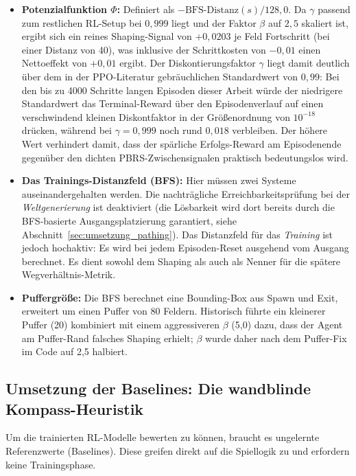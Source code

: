 \documentclass[
  a4paper,
  11pt,
  twoside,
  BCOR=8mm,           %
  headings=big,
  numbers=noenddot,
  listof=totoc,       %
  captions=tableheading,
]{scrreprt}
\begin{document}
\begin{itemize}
    \item \textbf{Potenzialfunktion $\Phi$:} Definiert als $-\text{BFS-Distanz}(s) / 128{,}0$. Da $\gamma$ passend zum restlichen RL-Setup bei $0{,}999$ liegt und der Faktor $\beta$ auf $2{,}5$ skaliert ist, ergibt sich ein reines Shaping-Signal von $+0{,}0203$ je Feld Fortschritt (bei einer Distanz von 40), was inklusive der Schrittkosten von $-0{,}01$ einen Nettoeffekt von $+0{,}01$ ergibt. Der Diskontierungsfaktor $\gamma$ liegt damit deutlich über dem in der PPO-Literatur gebräuchlichen Standardwert von $0{,}99$: Bei den bis zu 4000 Schritte langen Episoden dieser Arbeit würde der niedrigere Standardwert das Terminal-Reward über den Episodenverlauf auf einen verschwindend kleinen Diskontfaktor in der Größenordnung von $10^{-18}$ drücken, während bei $\gamma = 0{,}999$ noch rund $0{,}018$ verbleiben. Der höhere Wert verhindert damit, dass der spärliche Erfolgs-Reward am Episodenende gegenüber den dichten PBRS-Zwischensignalen praktisch bedeutungslos wird.
    \item \textbf{Das Trainings-Distanzfeld (BFS):} Hier müssen zwei Systeme auseinandergehalten werden. Die nachträgliche Erreichbarkeitsprüfung bei der \textit{Weltgenerierung} ist deaktiviert (die Lösbarkeit wird dort bereits durch die BFS-basierte Ausgangsplatzierung garantiert, siehe Abschnitt~\ref{sec:umsetzung_pathing}). Das Distanzfeld für das \textit{Training} ist jedoch hochaktiv: Es wird bei jedem Episoden-Reset ausgehend vom Ausgang berechnet. Es dient sowohl dem Shaping als auch als Nenner für die spätere Wegverhältnis-Metrik.
    \item \textbf{Puffergröße:} Die BFS berechnet eine Bounding-Box aus Spawn und Exit, erweitert um einen Puffer von 80 Feldern. Historisch führte ein kleinerer Puffer (20) kombiniert mit einem aggressiveren $\beta$ (5,0) dazu, dass der Agent am Puffer-Rand falsches Shaping erhielt; $\beta$ wurde daher nach dem Puffer-Fix im Code auf 2,5 halbiert.
\end{itemize}

\subsection{Umsetzung der Baselines: Die wandblinde Kompass-Heuristik}
\label{sec:impl_rl_baselines}
Um die trainierten RL-Modelle bewerten zu können, braucht es ungelernte Referenzwerte (Baselines). Diese greifen direkt auf die Spiellogik zu und erfordern keine Trainingsphase. 
\end{document}
